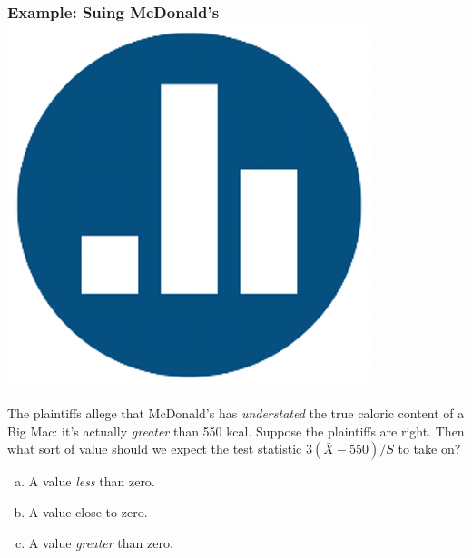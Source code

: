 \documentclass[handout]{beamer}
\begin{document}
\begin{frame}
\frametitle{Example: Suing McDonald's \hfill \includegraphics[scale = 0.05]{./images/clicker}}
The plaintiffs allege that McDonald's has \emph{understated} the true caloric content of a Big Mac: it's actually \emph{greater} than 550 kcal. \alert{Suppose the plaintiffs are right. Then what sort of value should we expect the test statistic $3(\bar{X} - 550)/S$ to take on?}

\vspace{1em}
\begin{enumerate}[(a)]
	\item A value \emph{less} than zero.
	\item A value close to zero.
	\item A value \emph{greater} than zero.
\end{enumerate}
\end{frame}
\end{document}
